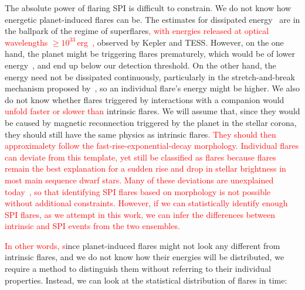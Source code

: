 \documentclass[twocolumn]{aastex631}
\begin{document}
The absolute power of flaring SPI is difficult to constrain. We do not know how energetic planet-induced flares can be. The estimates for dissipated energy~\citep{lanza2018closeby} are in the ballpark of the regime of superflares\textcolor{red}{, with energies released at optical wavelengths $\geq10^{33}\,$erg~\citep{schaefer2000superflares},} observed by Kepler and TESS. However, on the one hand, the planet might be triggering flares prematurely, which would be of lower energy~\citep{loyd2023flares}, and end up below our detection threshold. On the other hand, the energy need not be dissipated continuously, particularly in the stretch-and-break mechanism proposed by~\citep{lanza2012starplanet}, so an individual flare's energy might be higher. We also do not know whether flares triggered by interactions with a companion would \textcolor{red}{unfold faster or slower than} intrinsic flares. We will assume that, since they would be caused by magnetic reconnection triggered by the planet in the stellar corona, they should still have the same physics as intrinsic flares\textcolor{red}{. They should then approximalety follow the fast-rise-exponential-decay morphology. Individual flares can deviate from this template, yet still be classified as flares because flares remain the best explanation for a sudden rise and drop in stellar brightness in most main sequence dwarf stars. Many of these deviations are unexplained today~\citep{howard2022no}, so that identifying SPI flares based on morphology is not possible without additional constraints. However, if we can statistically identify enough SPI flares, as we attempt in this work, we can infer the differences between intrinsic and SPI events from the two ensembles.}

\textcolor{red}{In other words, s}ince planet-induced flares might not look any different from intrinsic flares, and we do not know how their energies will be distributed, we require a method to distinguish them without referring to their individual properties. Instead, we can look at the statistical distribution of flares in time: 
\end{document}
